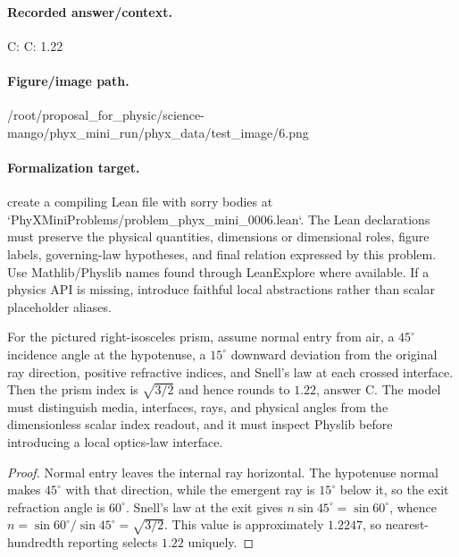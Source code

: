 \paragraph{Recorded answer/context.}
C: C: 1.22

\paragraph{Figure/image path.}
/root/proposal\_for\_physic/science-mango/phyx\_mini\_run/phyx\_data/test\_image/6.png

\paragraph{Formalization target.}
create a compiling Lean file with sorry bodies at `PhyXMiniProblems/problem\_phyx\_mini\_0006.lean`. The Lean declarations must preserve the physical quantities, dimensions or dimensional roles, figure labels, governing-law hypotheses, and final relation expressed by this problem.
Use Mathlib/Physlib names found through LeanExplore where available. If a physics API is missing, introduce faithful local abstractions rather than scalar placeholder aliases.

\begin{theorem}
\label{thm:physics:phyx_mini_0006:target}
For the pictured right-isosceles prism, assume normal entry from air, a
$45^\circ$ incidence angle at the hypotenuse, a $15^\circ$ downward deviation
from the original ray direction, positive refractive indices, and Snell's law
at each crossed interface. Then the prism index is $\sqrt{3/2}$ and hence
rounds to $1.22$, answer C. The model must distinguish media, interfaces,
rays, and physical angles from the dimensionless scalar index readout, and it
must inspect Physlib before introducing a local optics-law interface.
\end{theorem}
\begin{proof}
Normal entry leaves the internal ray horizontal. The hypotenuse normal makes
$45^\circ$ with that direction, while the emergent ray is $15^\circ$ below it,
so the exit refraction angle is $60^\circ$. Snell's law at the exit gives
$n\sin 45^\circ=\sin 60^\circ$, whence
$n=\sin 60^\circ/\sin 45^\circ=\sqrt{3/2}$. This value is approximately
$1.2247$, so nearest-hundredth reporting selects $1.22$ uniquely.
\end{proof}

